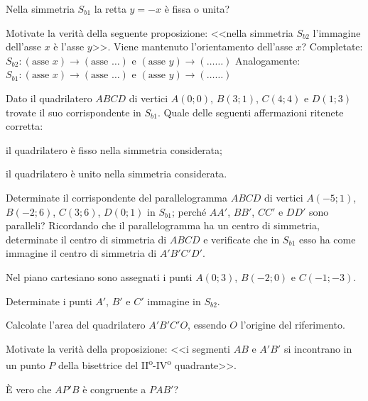 \begin{esercizio}
\label{ese:8.34} %
Nella simmetria $S_{b1}$ la retta $y=-x$ è fissa o unita?
\end{esercizio}

\begin{esercizio}
\label{ese:8.35} %
Motivate la verità della seguente proposizione: <<nella simmetria $S_{b2}$ l'immagine dell'asse $x$ è l'asse $y$>>. Viene mantenuto l'orientamento dell'asse $x$?
Completate: $S_{b2}:(\text{asse }x)\rightarrow (\text{asse } \ldots{})$ e $(\text{asse }y)\rightarrow(\ldots\ldots{})$
Analogamente: $S_{b1}:(\text{asse }x)\rightarrow (\text{asse } \ldots{})$ e $(\text{asse }y)\rightarrow(\ldots\ldots{})$
\end{esercizio}

\begin{esercizio}
\label{ese:8.36} %
Dato il quadrilatero $ABCD$ di vertici $A(0;0)$, $B(3;1)$, $C(4;4)$ e $D(1;3)$ trovate il suo corrispondente in $S_{b1}$. Quale delle seguenti affermazioni ritenete corretta:
\begin{enumeratea}
\item il quadrilatero è fisso nella simmetria considerata;
\item il quadrilatero è unito nella simmetria considerata.
\end{enumeratea}
\end{esercizio}

\begin{esercizio}
\label{ese:8.37} %
Determinate il corrispondente del parallelogramma $ABCD$ di vertici $A(-5;1)$, $B(-2;6)$, $C(3;6)$, $D(0;1)$ in $S_{b1}$; perché $AA'$, $BB'$, $CC'$ e $DD'$ sono paralleli? Ricordando che il parallelogramma ha un centro di simmetria, determinate il centro di simmetria di $ABCD$ e verificate che in $S_{b1}$ esso ha come immagine il centro di simmetria di $A'B'C'D'$.
\end{esercizio}

\begin{esercizio}
\label{ese:8.38} %
Nel piano cartesiano sono assegnati i punti $A(0;3)$, $B(-2;0)$ e $C(-1;-3)$.
\begin{enumeratea}
\item Determinate i punti $A'$, $B'$ e $C'$ immagine in $S_{b2}$.
\item Calcolate l'area del quadrilatero $A'B'C'O$, essendo $O$ l'origine del riferimento.
\item Motivate la verità della proposizione: <<i segmenti $AB$ e $A'B'$ si incontrano in un punto $P$ della bisettrice del II\textsuperscript{o}-IV\textsuperscript{o} quadrante>>.
\item \`E vero che $AP'B$ è congruente a $PAB'$?
\end{enumeratea}
\end{esercizio}

